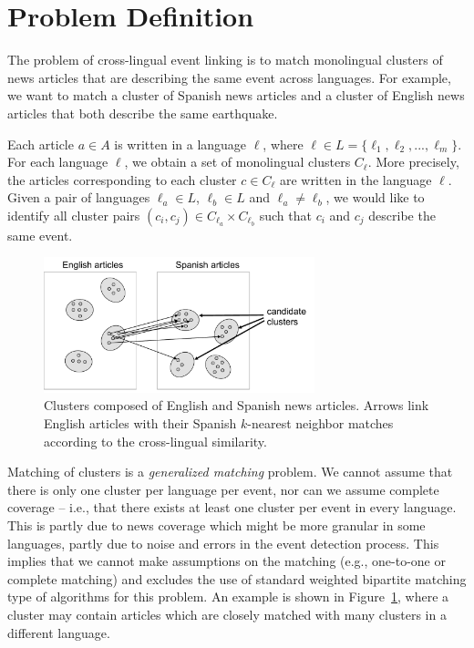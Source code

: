 \section{Problem Definition}

The problem of cross-lingual event linking is to match monolingual clusters of news articles
that are describing the same event across languages. For example, we want to match a cluster of
Spanish news articles and a cluster of English news articles that both describe the same earthquake.

Each article $a \in A$ is written in a language $\ell$, where $\ell \in L = \{\ell_1,\ell_2,...,\ell_m\}$.
For each language $\ell$, we obtain a set of monolingual clusters $C_{\ell}$. More precisely,
the articles corresponding to each cluster $c \in C_{\ell}$ are written in the language $\ell$.
Given a pair of languages $\ell_a \in L$, $\ell_b \in L$ and $\ell_a \not= \ell_b$, we would like
to identify all cluster pairs $(c_i, c_j) \in C_{\ell_a} \times C_{\ell_b}$ such that $c_i$ and $c_j$ describe the same event.

\begin{figure}[tb]
\centering
\includegraphics[width=0.7\textwidth]{figures/clusters.pdf}
\caption[Cluster linking]{Clusters composed of English and Spanish news articles. Arrows link English articles with their Spanish $k$-nearest neighbor matches according to the cross-lingual similarity.}
\label{fig:clusters}
\end{figure}

Matching of clusters is a \emph{generalized matching} problem. We cannot assume that there is only
one cluster per language per event, nor can we assume complete coverage -- i.e., that there exists
at least one cluster per event in every language. This is partly due to news coverage which might
be more granular in some languages, partly due to noise and errors in the event detection process. This
implies that we cannot make assumptions on the matching (e.g., one-to-one or complete matching) and excludes
the use of standard weighted bipartite matching type of algorithms for this problem. An example is shown in
Figure~\ref{fig:clusters}, where a cluster may contain articles which are closely matched with many clusters in a different language.

